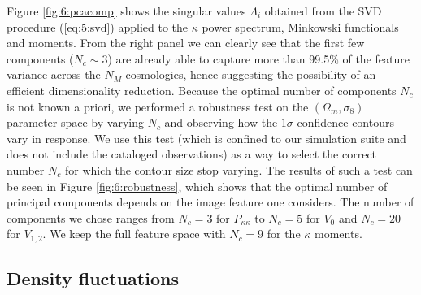 Figure \ref{fig:6:pcacomp} shows the singular values $\Lambda_i$ obtained from the SVD procedure (\ref{eq:5:svd}) applied to the $\kappa$ power spectrum, Minkowski functionals and moments. From the right panel we can clearly see that the first few components ($N_c\sim 3$) are already able to capture more than 99.5\% of the feature variance across the $N_M$ cosmologies, hence suggesting the possibility of an efficient dimensionality reduction. Because the optimal number of components $N_c$ is not known a priori, we performed a robustness test on the $(\Omega_m,\sigma_8)$ parameter space by varying $N_c$ and observing how the $1\sigma$ confidence contours vary in response. We use this test (which is confined to our simulation suite and does not include the cataloged observations) as a way to select the correct number $N_c$ for which the contour size stop varying. The results of such a test can be seen in Figure \ref{fig:6:robustness}, which shows that the optimal number of principal components depends on the image feature one considers. The number of components we chose ranges from $N_c=3$ for $P_{\kappa\kappa}$ to $N_c=5$ for $V_0$ and $N_c=20$ for $V_{1,2}$. We keep the full feature space with $N_c=9$ for the $\kappa$ moments. 

\subsection{Density fluctuations}

